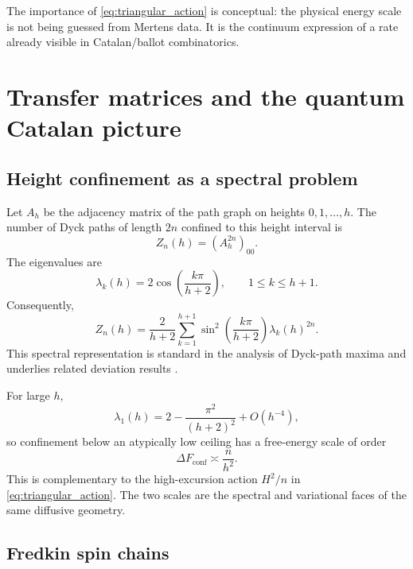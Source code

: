 \documentclass[11pt]{amsart}
\numberwithin{equation}{section}
\theoremstyle{plain}
\theoremstyle{definition}
\theoremstyle{remark}
\begin{document}
The importance of \eqref{eq:triangular_action} is conceptual: the physical energy scale is not being guessed from Mertens data.  It is the continuum expression of a rate already visible in Catalan/ballot combinatorics.

\section{Transfer matrices and the quantum Catalan picture}
\label{sec:transfer_quantum}

\subsection{Height confinement as a spectral problem}
\label{subsec:height_spectral}

Let $A_h$ be the adjacency matrix of the path graph on heights $0,1,\ldots,h$.  The number of Dyck paths of length $2n$ confined to this height interval is
\begin{equation}
Z_n(h)=(A_h^{2n})_{00}.
\label{eq:confined_partition_function}
\end{equation}
The eigenvalues are
\begin{equation}
\lambda_k(h)
=
2\cos\!\left(\frac{k\pi}{h+2}\right),
\qquad
1\le k\le h+1.
\label{eq:path_graph_eigenvalues}
\end{equation}
Consequently,
\begin{equation}
Z_n(h)
=
\frac{2}{h+2}
\sum_{k=1}^{h+1}
\sin^2\!\left(\frac{k\pi}{h+2}\right)
\lambda_k(h)^{2n}.
\label{eq:confined_spectral_sum}
\end{equation}
This spectral representation is standard in the analysis of Dyck-path maxima and underlies related deviation results \cite{Kousha2012}.

For large $h$,
\begin{equation}
\lambda_1(h)
=
2-\frac{\pi^2}{(h+2)^2}+O(h^{-4}),
\label{eq:ground_eigenvalue_expansion}
\end{equation}
so confinement below an atypically low ceiling has a free-energy scale of order
\begin{equation}
\Delta F_{\mathrm{conf}}
\asymp
\frac{n}{h^2}.
\label{eq:confinement_free_energy}
\end{equation}
This is complementary to the high-excursion action $H^2/n$ in \eqref{eq:triangular_action}.  The two scales are the spectral and variational faces of the same diffusive geometry.

\subsection{Fredkin spin chains}
\label{subsec:fredkin}
\end{document}
